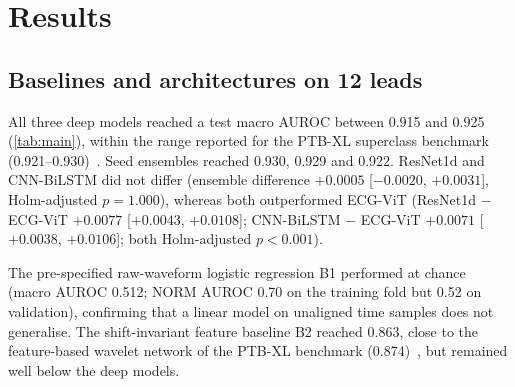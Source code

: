 \section{Results}
\label{sec:results}

\subsection{Baselines and architectures on 12 leads}
\label{sec:res_arch}
All three deep models reached a test macro AUROC between 0.915 and 0.925 (\cref{tab:main}), within the range reported for the PTB-XL superclass benchmark (0.921--0.930)~\cite{strodthoff2021benchmark}. Seed ensembles reached 0.930, 0.929 and 0.922. ResNet1d and CNN-BiLSTM did not differ (ensemble difference $+0.0005$ [$-0.0020$, $+0.0031$], Holm-adjusted $p=1.000$), whereas both outperformed ECG-ViT (ResNet1d $-$ ECG-ViT $+0.0077$ [$+0.0043$, $+0.0108$]; CNN-BiLSTM $-$ ECG-ViT $+0.0071$ [$+0.0038$, $+0.0106$]; both Holm-adjusted $p<0.001$).

The pre-specified raw-waveform logistic regression B1 performed at chance (macro AUROC 0.512; NORM AUROC 0.70 on the training fold but 0.52 on validation), confirming that a linear model on unaligned time samples does not generalise. The shift-invariant feature baseline B2 reached 0.863, close to the feature-based wavelet network of the PTB-XL benchmark (0.874)~\cite{strodthoff2021benchmark}, but remained well below the deep models.

\begin{table}[t]
\centering
\small
\caption{Test-fold results on 12 leads (T1). Deep models: mean $\pm$ SD over three seeds; seed-ensemble AUROC with bootstrap 95\% CI. Baselines are single deterministic fits.}
\label{tab:main}
\setlength{\tabcolsep}{4pt}
\end{table}

